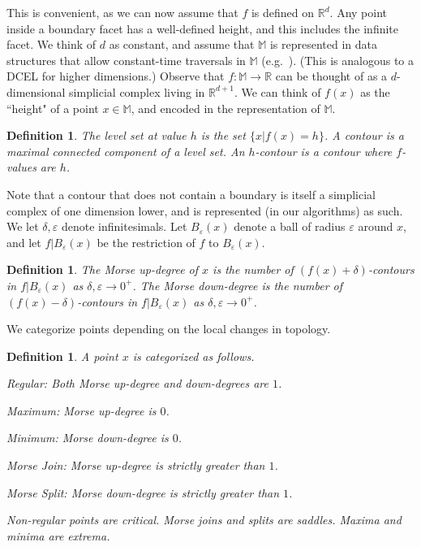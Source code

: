 \documentclass[11pt]{article}
\newtheorem{definition}[theorem]{Definition}
\theoremstyle{definition}
\newcommand{\MM}{\mathbb{M}}
\newcommand{\RR}{\mathbb{R}}
\newcommand{\eps}{\varepsilon}
\begin{document}
This is convenient, as we can now assume that $f$ is defined on $\RR^d$. Any point inside a boundary facet
has a well-defined height, and this includes the infinite facet. 
We think of $d$ as constant, and assume that $\MM$ is represented in data structures that allow constant-time traversals
in $\MM$ (e.g.~\cite{BoMa12}). (This is analogous to a DCEL for higher dimensions.)
Observe that $f:\MM \rightarrow \RR$ can be thought of as a $d$-dimensional simplicial complex living in $\RR^{d+1}$.
We can think of $f(x)$ as the ``height" of a point $x \in \MM$, and encoded in the representation of $\MM$. 

\begin{definition} \label{def:level} The level set at value $h$ is the set $\{x| f(x) = h\}$.
A contour is a maximal connected component of a level set. An $h$-contour is a contour where $f$-values are $h$.
\end{definition}

Note that a contour that does not contain a boundary is itself a simplicial complex of one dimension lower, and is represented (in our algorithms) as such.
We let $\delta, \eps$ denote infinitesimals. Let $B_\eps(x)$ denote a ball of radius $\eps$ around $x$, and let 
$f|B_\eps(x)$ be the restriction of $f$ to $B_\eps(x)$.


\begin{definition} \label{def:deg} The Morse up-degree of $x$ is the number of $(f(x) + \delta)$-contours in $f|B_\eps(x)$
as $\delta, \eps \rightarrow 0^+$. The Morse down-degree is the number of $(f(x) - \delta)$-contours in $f|B_\eps(x)$
as $\delta, \eps \rightarrow 0^+$.
\end{definition}

We categorize points depending on the local changes in topology.

\begin{definition} \label{def:points} A point $x$ is categorized as follows.
\begin{asparaitem}
	\item Regular: Both Morse up-degree and down-degrees are $1$.
	\item Maximum: Morse up-degree is $0$.
	\item Minimum: Morse down-degree is $0$.
	\item Morse Join: Morse up-degree is strictly greater than $1$.
	\item Morse Split: Morse down-degree is strictly greater than $1$.
\end{asparaitem}
Non-regular points are \emph{critical}. Morse joins and splits are \emph{saddles}.
Maxima and minima are \emph{extrema}.
\end{definition}
\end{document}
